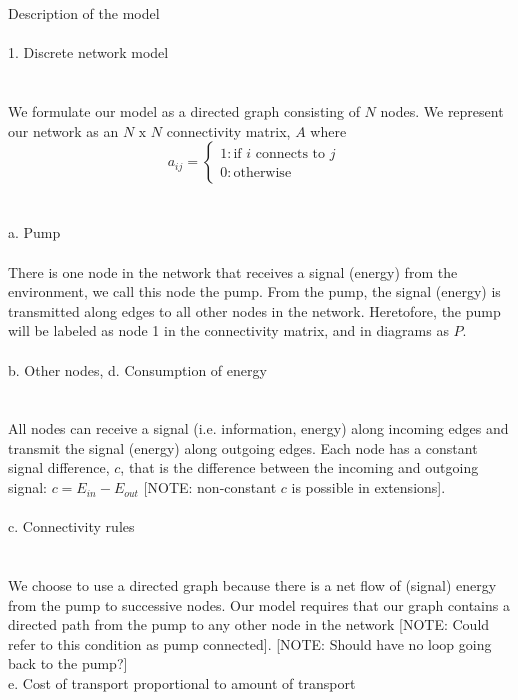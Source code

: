 \documentclass{amsart}
\theoremstyle{plain}
\numberwithin{equation}{section}
\begin{document}
Description of the model\\
\\
1. Discrete network model\\
\\
\\
We formulate our model as a directed graph consisting of $N$ nodes. We represent our network as an $N \text{ x } N$ connectivity matrix, $A$ where \begin{displaymath}
   a_{ij}= \left\{
     \begin{array}{lr}
       1 : \text{if }i \text{ connects to } j &\\
       0 : \text{otherwise}&
     \end{array}
   \right.
\end{displaymath}
\\
\\
 a. Pump\\
\\
There is one node in the network that receives a signal (energy) from the environment, we call this node the pump. From the pump, the signal (energy) is transmitted along edges to all other nodes in the network. Heretofore, the pump will be labeled as node 1 in the connectivity matrix, and in diagrams as $P$.
\\
\\
 b. Other nodes, d. Consumption of energy\\
\\
\\
All nodes can receive a signal (i.e. information, energy) along incoming edges and transmit the signal (energy) along outgoing edges. Each node has a constant signal difference, $c$, that is the difference between the incoming and outgoing signal: $c=E_{in}-E_{out}$ [NOTE: non-constant $c$ is possible in extensions]. 
\\
\\
 c. Connectivity rules\\
\\
\\
We choose to use a directed graph because there is a net flow of (signal) energy from the pump to successive nodes. Our model requires that our graph contains a directed path from the pump to any other node in the network [NOTE: Could refer to this condition as pump connected]. [NOTE: Should have no loop going back to the pump?]
\\
 e. Cost of transport proportional to amount of transport\\
\\
\end{document}
